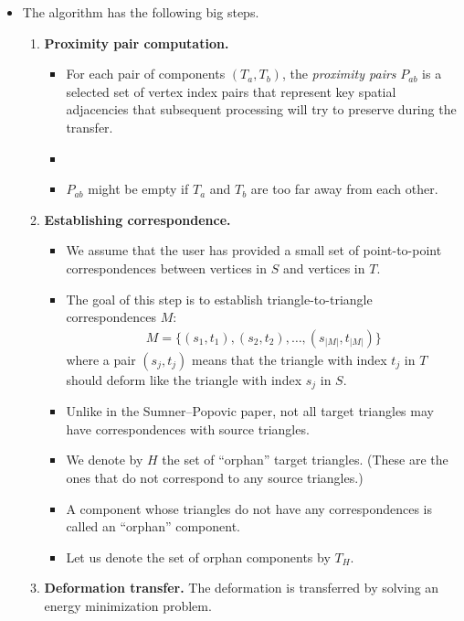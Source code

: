 \documentclass[10pt]{article}
\begin{document}
\begin{itemize}
    \item The algorithm has the following big steps.

    \begin{enumerate}
        \item {\bf Proximity pair computation.}        
        \begin{itemize}
            \item For each pair of components $(T_a, T_b)$, the \emph{proximity pairs} $P_{ab}$ is a selected set of vertex index pairs that represent key spatial adjacencies that subsequent processing will try to preserve during the transfer.
            \item 
            \item $P_{ab}$ might be empty if $T_a$ and $T_b$ are too far away from each other.
        \end{itemize}

        \item {\bf Establishing correspondence.}
        \begin{itemize}
            \item We assume that the user has provided a small set of point-to-point correspondences between vertices in $S$ and vertices in $T$.
            
            \item The goal of this step is to establish triangle-to-triangle correspondences $M$:
            \begin{align*}
                M = \{ (s_1, t_1), (s_2, t_2), \ldots, (s_{|M|}, t_{|M|}) \}
            \end{align*}
            where a pair $(s_j, t_j)$ means that the triangle with index $t_j$ in $T$ should deform like the triangle with index $s_j$ in $S$.

            \item Unlike in the Sumner--Popovic paper, not all target triangles may have correspondences with source triangles.
            
            \item We denote by $H$ the set of ``orphan'' target triangles. (These are the ones that do not correspond to any source triangles.)
            
            \item A component whose triangles do not have any correspondences is called an ``orphan'' component. 
            
            \item Let us denote the set of orphan components by $T_H$.
        \end{itemize}        

        \item {\bf Deformation transfer.} The deformation is transferred by solving an energy minimization problem.
    \end{enumerate}
\end{itemize}
\end{document}
